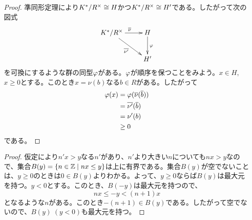 \begin{proof}
  準同形定理により$K^* / R^{\times} \cong H$かつ$K^* / R^{\times} \cong H'$である。したがって次の図式
  \[
  \xymatrix{
  K^*/ R^{\tm} \ar[r]^{\ol{\nu} } \ar[dr]_{\ol{\nu'}} & H \ar[d]^{\vp} \\
  {} & H'
  }
  \]
を可換にするような群の同型${\varphi}$がある。${\varphi}$が順序を保つことをみよう。$x \in H$, $x \geq 0$とする。このとき$x = \nu(b)$なる$b \in R$がある。したがって
\begin{align*}
  {\varphi}(x) &= {\varphi}(\overline{\nu}(\overline{b}) ) \\
  &= \overline{\nu'}(\overline{b}) \\
  &= \nu'(b) \\
  &\geq 0
\end{align*}
である。
  \begin{comment}
  証明してみた。次の図式を可換にする$\vp$をみつければよい。
  \[
  \xymatrix{
  K^* \ar[r]^{\nu} \ar[dr]_{\nu'} & H \ar[d]^{\vp} \\
  {} & H'
  }
  \]
  $x \in H$とすると$x=\nu(a)$なる$a \in K^*$があるので、このとき
  \[
  \vp(x)=\nu'(a)
  \]
  と定めれば(well-definedならば)可換にできる。well-definedであることを示そう。$x = \nu(a) = \nu(b)$なる$a,b \in K^*$があったとする。このとき$ab^{-1} \in \Ker \nu$である。$R$は付値環なので、$ab^{-1}$と$a^{-1}b$のどちらかは$R$の元であり、したがって$ab^{-1}$は$R$の単元である。ゆえに$\nu'(ab^{-1})=0$であって、$\nu'(a)= \nu'(b)$となる。よって$\vp$はwell-defindである。

  $x = \nu(a)$かつ$y = \nu(b)$だとする。このとき
  \begin{align*}
    \vp(x+y) &= \vp(\nu(a)+\nu(b) ) \\
    &= \vp(\nu(ab)) \\
    &= \nu'(ab) \\
    &= \nu'(a) + \nu'(b) \\
    &= \vp(x) + \vp(y)
  \end{align*}
  だから$\vp$は準同形。

  もし$x \geq 0$ならば、$x = \nu(a)$なる$a$は$R$の元である。よって$\vp(x)=\nu'(a) \geq 0$である。つまり$\vp$は順序を保つ。
\end{comment}
\end{proof}



\begin{proof}
  仮定により$n' x > y$なる$n'$があり、$n'$より大きい$n$についても$nx>y$なので、集合$B(y) = \left\{ n \in {\mathbb Z} \mathrel{} \middle| \mathrel{} nx \leq y \right\}$は上に有界である。集合$B(y)$が空でないことは、$y \geq 0$のときは$0 \in B(y)$よりわかる。よって、$y \geq 0$ならば$B(y)$は最大元を持つ。$y < 0$とする。このとき、$B(-y)$は最大元を持つので、
  \[
  nx \leq -y < (n+1)x
  \]
  となるような$n$がある。このとき$-(n+1) \in B(y)$である。したがって空でないので、$B(y) \; (y<0)$も最大元を持つ。
\end{proof}


